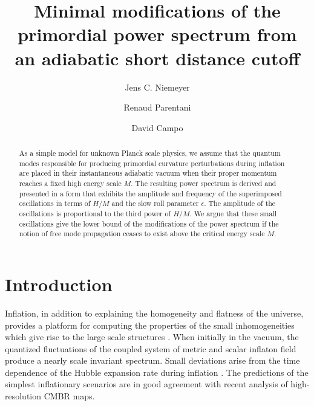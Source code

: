 \documentclass[a4paper,aps,prd,preprint,groupedaddress,nofootinbib]{revtex4}
\begin{document}
\title{Minimal modifications of the primordial power spectrum from an
adiabatic short distance cutoff}   

\author{Jens C. Niemeyer}
\author{Renaud Parentani}
\author{David Campo}


\begin{abstract}
As a simple model for unknown Planck scale physics, we assume that the
quantum modes responsible for producing primordial curvature
perturbations during inflation are placed in their instantaneous
adiabatic vacuum when their proper momentum reaches a fixed high
energy scale $M$. The resulting power spectrum is derived and
presented in a form that exhibits the amplitude and frequency of the
superimposed oscillations in terms of $H/M$
and the slow roll parameter $\epsilon$. The amplitude of the
oscillations  is proportional to the third power of $H/M$.  We argue
that these small oscillations give the lower bound of the
modifications of the power spectrum if the notion of free mode
propagation ceases to exist above the critical energy scale $M$.
\end{abstract}

\pacs{}

\maketitle

\section{Introduction}

Inflation, in addition to explaining the homogeneity and flatness of
the universe, provides a platform for computing the properties of the
small  inhomogeneities which give rise to the large scale  structures
\cite{L90,LL00}.  When initially in the vacuum, the quantized
fluctuations of the coupled system of metric and scalar inflaton field
produce a nearly scale invariant spectrum. Small deviations arise from
the time dependence of the  Hubble expansion rate during inflation
\cite{MFB92}.  The  predictions of the simplest inflationary scenarios
are in good agreement with recent analysis of high-resolution CMBR
maps.
\end{document}
